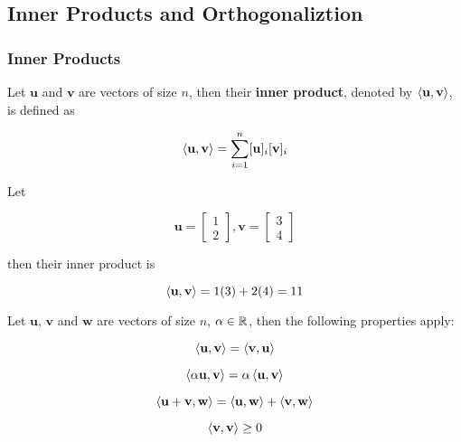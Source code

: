 \documentclass[a4paper,12pt]{article}
\begin{document}
\subsection{Inner Products and Orthogonaliztion}
\subsubsection{Inner Products}
\begin{dft}
  Let $\mathbf{u}$ and $\mathbf{v}$ are vectors of size $n$, then their \textbf{inner product}, denoted by $\left\langle \mathbf{u},\mathbf{v}\right\rangle$, is defined as

  $$\left\langle \mathbf{u},\mathbf{v}\right\rangle=\sum_{i=1}^{n}[\mathbf{u}]_{i}[\mathbf{v}]_{i}$$
\end{dft}\n

\begin{exm}
  Let

  $$\mathbf{u}=\begin{bmatrix}
    1\\
    2
  \end{bmatrix},\mathbf{v}=\begin{bmatrix}
    3\\
    4
  \end{bmatrix}$$\s

  then their inner product is

  $$\left\langle \mathbf{u},\mathbf{v}\right\rangle=1(3)+2(4)=11$$
\end{exm}\n

\begin{pst}
  Let $\mathbf{u}$, $\mathbf{v}$ and $\mathbf{w}$ are vectors of size $n$, $\alpha\in\mathbb{R}$, then the following properties apply:

  \begin{alist}
    \item
    
    $$\left\langle \mathbf{u},\mathbf{v}\right\rangle=\left\langle \mathbf{v},\mathbf{u}\right\rangle$$

    \item
    
    $$\left\langle \alpha\mathbf{u},\mathbf{v}\right\rangle=\alpha\left\langle \mathbf{u},\mathbf{v}\right\rangle$$

    \item
    
    $$\left\langle \mathbf{u}+\mathbf{v},\mathbf{w}\right\rangle=\left\langle \mathbf{u},\mathbf{w}\right\rangle+\left\langle \mathbf{v},\mathbf{w}\right\rangle$$

    \item
    
    $$\left\langle \mathbf{v},\mathbf{v}\right\rangle\geq 0$$
  \end{alist}
\end{pst}\n
\end{document}
